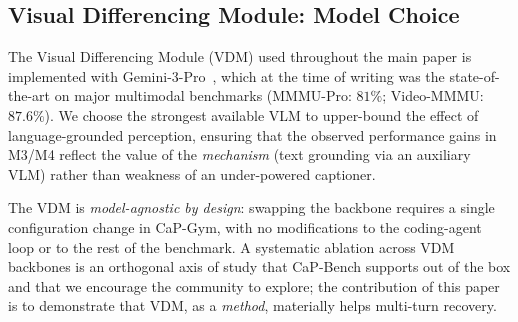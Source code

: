 \subsection{Visual Differencing Module: Model Choice}
\label{app:vdm_choice}
The Visual Differencing Module (VDM) used throughout the main paper is implemented with Gemini-3-Pro~\cite{google_deepmind_gemini3pro_modelcard_2025}, which at the time of writing was the state-of-the-art on major multimodal benchmarks (MMMU-Pro: $81\%$; Video-MMMU: $87.6\%$). We choose the strongest available VLM to upper-bound the effect of language-grounded perception, ensuring that the observed performance gains in M3/M4 reflect the value of the \emph{mechanism} (text grounding via an auxiliary VLM) rather than weakness of an under-powered captioner.

The VDM is \emph{model-agnostic by design}: swapping the backbone requires a single configuration change in CaP-Gym, with no modifications to the coding-agent loop or to the rest of the benchmark. A systematic ablation across VDM backbones is an orthogonal axis of study that CaP-Bench supports out of the box and that we encourage the community to explore; the contribution of this paper is to demonstrate that VDM, as a \emph{method}, materially helps multi-turn recovery.

